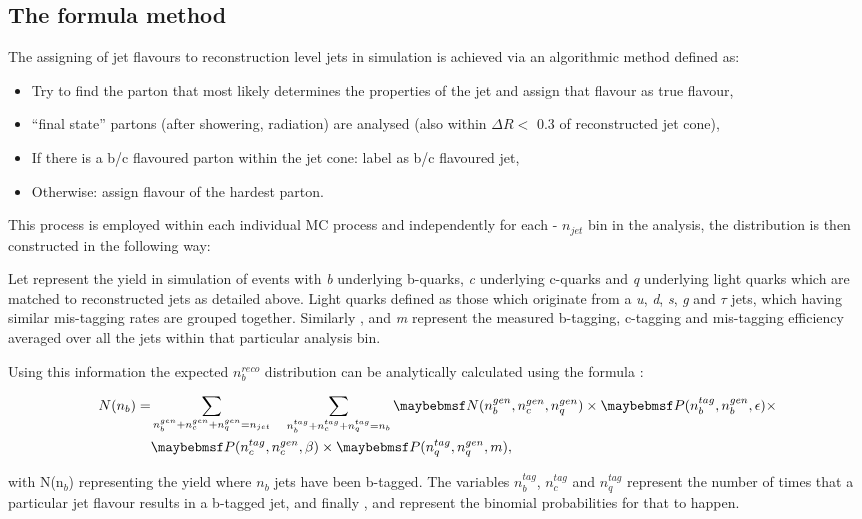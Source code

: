 \subsection{The formula method}
\label{subsec:formulamethod}

The assigning of jet flavours to reconstruction level jets in simulation is achieved via an algorithmic method defined as:

\begin{itemize}
\item Try to find the parton that most likely determines the properties of the jet and assign that flavour as true flavour,
\item ``final state'' partons (after showering, radiation) are analysed (also within $\Delta R <$ 0.3 of reconstructed jet cone),
\item If there is a b/c flavoured parton within the jet cone: label as b/c flavoured jet,
\item Otherwise: assign flavour of the hardest parton.
\end{itemize}

This process is employed within each individual MC process and independently for each \theht - $n_{jet}$ bin in the analysis, the \nbreco distribution is then constructed in the following way:

 Let \nbcq represent the yield in simulation of events with \textit{b} underlying b-quarks, \textit{c} underlying c-quarks and \textit{q} underlying light quarks which are matched to reconstructed jets as detailed above. Light quarks defined as those which originate from a \textit{u}, \textit{d}, \textit{s}, \textit{g} and $\tau$ jets, which having similar mis-tagging rates are grouped together.  Similarly \eff, \ceff and \textit{m} represent the measured b-tagging, c-tagging and mis-tagging efficiency averaged over all the jets within that particular analysis bin. 
 
 Using this information the expected $n_{b}^{reco}$ distribution can be analytically calculated using the formula :

\begin{align}
\label{eq:btagformula}
N(n_{b}) =& \sum_{n_{b}^{gen}+n_{c}^{gen}+n_{q}^{gen} = n_{jet}} \quad \sum_{n_{b}^{tag}+n_{c}^{tag}+n_{q}^{tag} = n_{b}} \nbcq \times \probb \times \nonumber \\
& \probc \times \probl,
\end{align}

with N(n$_{b}$) representing the yield where $n_{b}$ jets have been b-tagged.  The variables $n_{b}^{tag}$, $n_{c}^{tag}$ and $n_{q}^{tag}$ represent the number of times that a particular jet flavour results in a b-tagged jet, and finally \probb, \probc and \probl represent the binomial probabilities for that to happen. 

